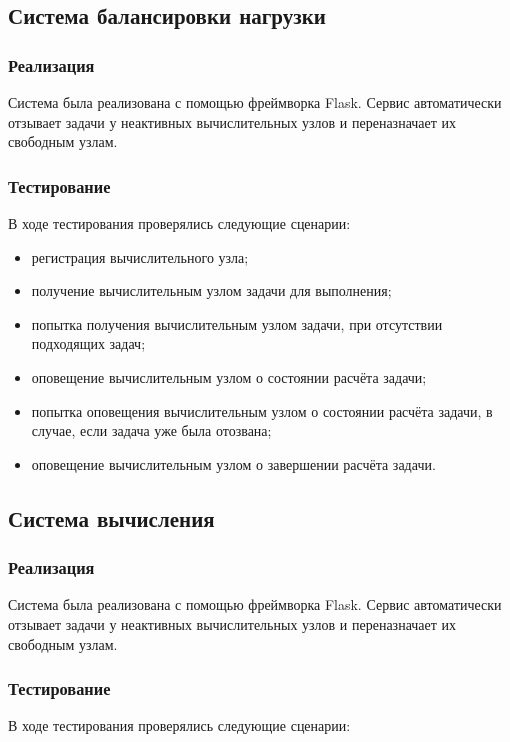 \documentclass[a4paper,12pt]{report}
\numberwithin{equation}{section}
\begin{document}
  \subsection{Система балансировки нагрузки}
  \subsubsection{Реализация}
  Система была реализована с помощью фреймворка Flask.
  Сервис автоматически отзывает задачи у неактивных вычислительных узлов и переназначает их свободным узлам.
  
  \subsubsection{Тестирование}
  В ходе тестирования проверялись следующие сценарии:
  
  \begin{itemize}
    \item регистрация вычислительного узла;
    \item получение вычислительным узлом задачи для выполнения;
    \item попытка получения вычислительным узлом задачи, при отсутствии подходящих задач;
    \item оповещение вычислительным узлом о состоянии расчёта задачи;
    \item попытка оповещения вычислительным узлом о состоянии расчёта задачи, в случае, если задача уже была отозвана;
    \item оповещение вычислительным узлом о завершении расчёта задачи.
  \end{itemize}
  
  \subsection{Система вычисления}
  \subsubsection{Реализация}
  Система была реализована с помощью фреймворка Flask.
  Сервис автоматически отзывает задачи у неактивных вычислительных узлов и переназначает их свободным узлам.
  
  \subsubsection{Тестирование}
  В ходе тестирования проверялись следующие сценарии:
  
\end{document}
